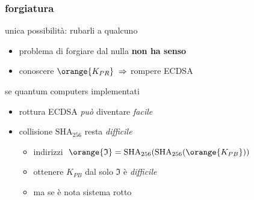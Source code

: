 \begin{frame}
	\frametitle{forgiatura}
	
	unica possibilità: rubarli a qualcuno
	\begin{itemize}
	  \item problema di forgiare dal nulla \textbf{non ha senso}
	  \item  conoscere $\orange{K_{PR}}\;\Rightarrow$ rompere ECDSA
	\end{itemize}
	\vspace{7pt}
	se {\color{blue}quantum computers} implementati 
	  \begin{itemize}
	    \item rottura ECDSA \textit{può} diventare \textit{facile}
	    \item collisione $\mathrm{SHA}_{256}$ resta \textit{difficile}
	  	\begin{itemize}
	  		\item indirizzi $\;\orange{\mathfrak{I}} = \mathrm{SHA}_{256}(\mathrm{SHA}_{256}(\orange{K_{PB}}))$
		    \item ottenere $K_{PB}$ dal solo $\mathfrak{I}$ è \textit{difficile}
		    \item ma se è nota sistema rotto
		\end{itemize}
	  \end{itemize}
\end{frame}